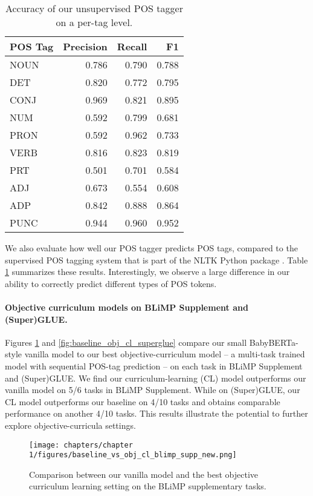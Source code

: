 \begin{table}[h]
\begin{tabular}{lrrr}
\toprule
POS Tag & Precision & Recall & F1 \\
\midrule
NOUN & 0.786 & 0.790 & 0.788 \\
DET & 0.820 & 0.772 & 0.795 \\
CONJ & 0.969 & 0.821 & 0.895 \\
NUM & 0.592 & 0.799 & 0.681 \\
PRON & 0.592 & 0.962 & 0.733 \\   
VERB & 0.816 & 0.823 & 0.819 \\
PRT & 0.501 & 0.701 & 0.584 \\
ADJ & 0.673 & 0.554 & 0.608 \\
ADP & 0.842 & 0.888 & 0.864 \\
PUNC & 0.944 & 0.960 & 0.952 \\
\bottomrule
\end{tabular}
\caption{\label{tbl:unsupervised-pos-performance} Accuracy of our unsupervised POS tagger on a per-tag level.}
\end{table}


We also evaluate how well our POS tagger predicts POS tags, compared to the  supervised POS tagging system that is part of the NLTK Python package \cite{bird2009natural}. Table \ref{tbl:unsupervised-pos-performance} summarizes these results. Interestingly, we observe a large difference in our ability to correctly predict different types of POS tokens.

\paragraph{Objective curriculum models on BLiMP Supplement and (Super)GLUE.} Figures \ref{fig:baseline_obj_cl_blimp_supp} and \ref{fig:baseline_obj_cl_superglue} compare our small BabyBERTa-style vanilla  model to our best objective-curriculum model -- a multi-task trained model with sequential POS-tag prediction -- on each task in BLiMP Supplement and (Super)GLUE. We find our curriculum-learning (CL) model outperforms our vanilla model on 5/6 tasks in BLiMP Supplement. While on (Super)GLUE, our CL model outperforms our baseline on 4/10 tasks and obtains comparable performance on another 4/10 tasks. This results illustrate the potential to further explore objective-curricula settings.

\begin{figure}[h]
\centering
\texttt{[image: chapters/chapter 1/figures/baseline\_vs\_obj\_cl\_blimp\_supp\_new.png]}
\caption{\label{fig:baseline_obj_cl_blimp_supp} Comparison between our vanilla model and the best objective curriculum learning setting on the BLiMP supplementary tasks.}
\end{figure}


